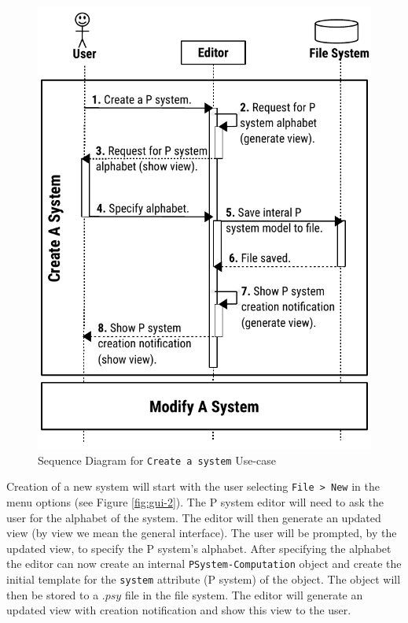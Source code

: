 \documentclass{article}
\begin{document}
\begin{figure}[H]
\begin{center}
\includegraphics[scale=0.75]{figures/zzz-sequence-create.pdf}
\caption{Sequence Diagram for \texttt{Create a system} Use-case}
\label{fig:sequence-create}
\end{center}
\end{figure}

	
Creation of a new system will start with the user selecting \texttt{File > New} in the menu options 
(see Figure \ref{fig:gui-2}).  The P system editor will need to ask the user for the alphabet of 
the system. The editor will then generate an updated view (by view we mean the general interface).
The user will be prompted, by the updated view, to specify the P system's alphabet. After specifying
the alphabet the editor can now create an internal \texttt{PSystem-Computation} object and create 
the  initial template for the \texttt{system} attribute (P system) of the object. The object will 
then be stored to a $.psy$ file in the file system. The editor will generate an updated view with 
creation notification and show this view to the user.
\end{document}
